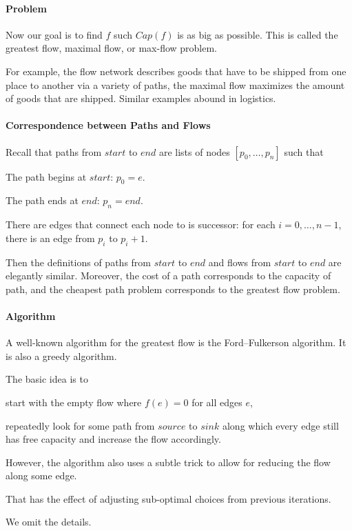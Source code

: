 \paragraph{Problem}
Now our goal is to find $f$ such $Cap(f)$ is as big as possible.
This is called the greatest flow, maximal flow, or max-flow problem.

For example, the flow network describes goods that have to be shipped from one place to another via a variety of paths, the maximal flow maximizes the amount of goods that are shipped.
Similar examples abound in logistics.

\paragraph{Correspondence between Paths and Flows}
Recall that paths from $start$ to $end$ are lists of nodes $[p_0,\ldots,p_n]$ such that
\begin{compactitem}
 \item The path begins at $start$: $p_0=e$.
 \item The path ends at $end$: $p_n=end$.
 \item There are edges that connect each node to is successor: for each $i=0,\ldots,n-1$, there is an edge from $p_i$ to $p_i+1$.
\end{compactitem}

Then the definitions of paths from $start$ to $end$ and flows from $start$ to $end$ are elegantly similar.
Moreover, the cost of a path corresponds to the capacity of path, and the cheapest path problem corresponds to the greatest flow problem.

\paragraph{Algorithm}
A well-known algorithm for the greatest flow is the Ford–Fulkerson algorithm.
It is also a greedy algorithm.

The basic idea is to
\begin{compactitem}
\item start with the empty flow where $f(e)=0$ for all edges $e$,
\item repeatedly look for some path from $source$ to $sink$ along which every edge still has free capacity and increase the flow accordingly.
\end{compactitem}
However, the algorithm also uses a subtle trick to allow for reducing the flow along some edge.

That has the effect of adjusting sub-optimal choices from previous iterations.

We omit the details.